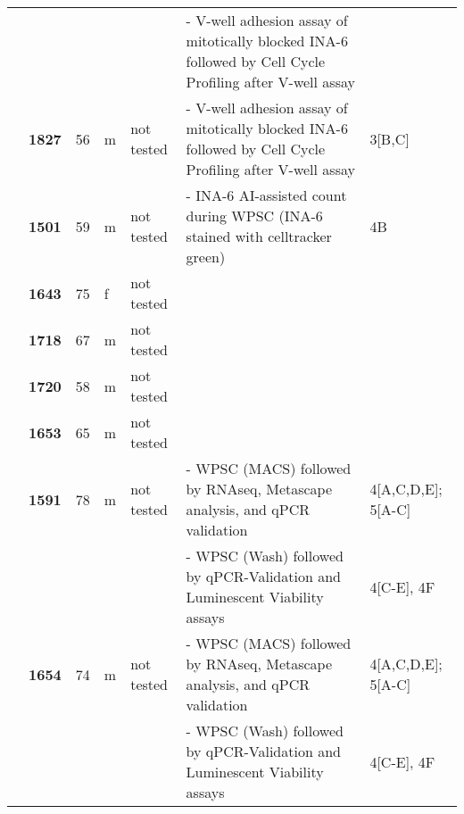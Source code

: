 {\begin{longtable}{%
    |>{\bfseries}p{1.5cm}|
    >{\bfseries}p{1.2cm}|
    p{1.2cm}|
    p{1cm}|
    p{2.3cm}|
    >{\tiny}p{4cm}|
    p{1.7cm}|
    }
     &       &    &   &            & - V-well adhesion assay of mitotically blocked INA-6 followed by Cell Cycle Profiling after V-well assay &                                         \\
    \hhline{~----~~}
     & 1827  & 56 & m & not tested & - V-well adhesion assay of mitotically blocked INA-6 followed by Cell Cycle Profiling after V-well assay & 3[B,C]                                  \\
    \hhline{~------}
     & 1501  & 59 & m & not tested & - INA-6 AI-assisted count during WPSC (INA-6 stained with celltracker green)                             & 4B                                      \\
    \hhline{~----~~}
     & 1643  & 75 & f & not tested &                                                                                                          &                                         \\
    \hhline{~----~~}
    \multirow{3}{1.5cm}{hMSC}
     & 1718  & 67 & m & not tested &                                                                                                          &                                         \\
    \hhline{~----~~}
     & 1720  & 58 & m & not tested &                                                                                                          &                                         \\
    \hhline{~----~~}
     & 1653  & 65 & m & not tested &                                                                                                          &                                         \\
    \hhline{~------}
     & 1591  & 78 & m & not tested & - WPSC (MACS) followed by RNAseq, Metascape analysis, and qPCR validation                                & 4[A,C,D,E]; 5[A-C]                      \\
    \hhline{~~~~~--}
     &       &    &   &            & - WPSC (Wash) followed by qPCR-Validation and Luminescent Viability assays                               & 4[C-E], 4F                              \\
    \hhline{~------}
     & 1654  & 74 & m & not tested & - WPSC (MACS) followed by RNAseq, Metascape analysis, and qPCR validation                                & 4[A,C,D,E]; 5[A-C]                      \\
    \hhline{~~~~~--}
     &       &    &   &            & - WPSC (Wash) followed by qPCR-Validation and Luminescent Viability assays                               & 4[C-E], 4F                              \\

\end{longtable}}
